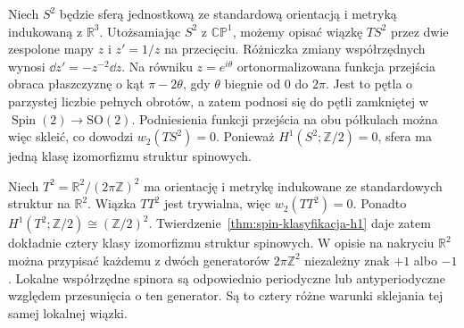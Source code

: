 \begin{przyklad}
Niech $S^2$ będzie sferą jednostkową ze standardową
orientacją i metryką indukowaną z $\mathbb R^3$.
Utożsamiając $S^2$ z $\mathbb{CP}^1$, możemy
opisać wiązkę $TS^2$ przez dwie zespolone mapy
$z$ i $z'=1/z$ na przecięciu. Różniczka zmiany
współrzędnych wynosi $\dd z'=-z^{-2}\dd z$.
Na równiku $z=e^{i\theta}$ ortonormalizowana
funkcja przejścia obraca płaszczyznę o kąt
$\pi-2\theta$, gdy $\theta$ biegnie od $0$ do $2\pi$.
Jest to pętla o parzystej liczbie pełnych obrotów,
a zatem podnosi się do pętli zamkniętej w
$\operatorname{Spin}(2)\to\mathrm{SO}(2)$.
Podniesienia funkcji przejścia na obu półkulach
można więc skleić, co dowodzi $w_2(TS^2)=0$.
Ponieważ $H^1(S^2;\mathbb Z/2)=0$, sfera ma
jedną klasę izomorfizmu struktur spinowych.
\end{przyklad}

\begin{przyklad}
Niech $T^2=\mathbb R^2/(2\pi\mathbb Z)^2$ ma orientację
i metrykę indukowane ze standardowych struktur
na $\mathbb R^2$. Wiązka $TT^2$ jest trywialna,
więc $w_2(TT^2)=0$. Ponadto
$H^1(T^2;\mathbb Z/2)\cong(\mathbb Z/2)^2$.
Twierdzenie~\ref{thm:spin-klasyfikacja-h1} daje
zatem dokładnie cztery klasy izomorfizmu struktur
spinowych. W opisie na nakryciu $\mathbb R^2$
można przypisać każdemu z dwóch generatorów
$2\pi\mathbb Z^2$ niezależny znak $+1$ albo $-1$.
Lokalne współrzędne spinora są odpowiednio
periodyczne lub antyperiodyczne względem
przesunięcia o ten generator. Są to cztery różne
warunki sklejania tej samej lokalnej wiązki.
\end{przyklad}

